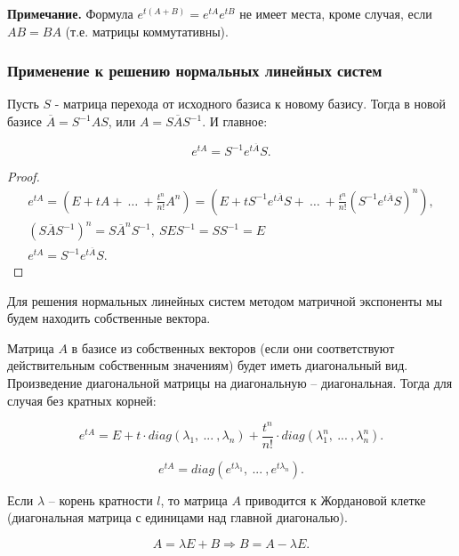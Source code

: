 \textbf{Примечание.} Формула $e^{t(A+B)} = e^{tA}e^{tB}$ не имеет места, кроме случая, если $AB = BA$ (т.е. матрицы коммутативны).

\subsubsection{Применение к решению нормальных линейных систем}

\begin{theorem}

Пусть $S$ - матрица перехода от исходного базиса к новому базису. Тогда в новой базисе $\overline{A} = S^{-1}AS$, или $A = S\overline{A}S^{-1}$. И главное:

\[e^{tA} = S^{-1}e^{t\overline{A}}S.\]

\end{theorem}

\begin{proof}
	\begin{equation*}
		\begin{gathered}
 e^{tA} = \left(E + tA +\ \dots\ + \frac{t^{n}}{n!}A^{n}\right) = \left(E + tS^{-1}e^{t\overline{A}}S +\ \dots\ + \frac{t^{n}}{n!}(S^{-1}e^{t\overline{A}}S)^{n}\right), \\
 (S\overline{A}S^{-1})^n = S\overline{A}^nS^{-1},\ SES^{-1} = SS^{-1} = E \\
 e^{tA} = S^{-1}e^{t\overline{A}}S.
		\end{gathered}
	\end{equation*}
\end{proof}

Для решения нормальных линейных систем методом матричной экспоненты мы будем находить собственные вектора.

Матрица $A$ в базисе из собственных векторов (если они соответствуют действительным собственным значениям) будет иметь диагональный вид. Произведение диагональной матрицы на диагональную -- диагональная. Тогда для случая без кратных корней:

\[ e^{tA} = E + t\cdot diag(\lambda_1,\ ...\ ,\lambda_n) + \frac{t^n}{n!}\cdot diag(\lambda_1^n,\ ...\ ,\lambda_n^n).\]

\[ e^{tA} = diag(e^{t\lambda_1},\ ...\ , e^{t\lambda_n}).\]

Если $\lambda$ -- корень кратности $l$, то матрица $A$ приводится к Жордановой клетке (диагональная матрица с единицами над главной диагональю).

\[ A = \lambda E + B \Rightarrow B = A - \lambda E. \]

